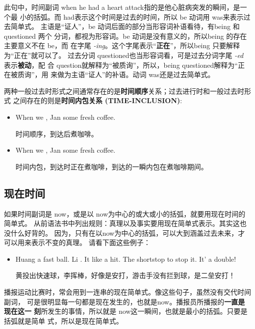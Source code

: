 此句中，时间副词 when he had a heart attack指的是他心脏病突发的瞬间，是一个最
小的括弧。而 had表示这个时间是过去的时间，所以 be 动词用 was来表示过去简单式。
主语是“证人”，be 动词后面的部分当形容词补语看待，有being 和 questioned 两个
分词，都视为形容词。be 动词是没有意义的，所以being 的存在主要意义不在 be，而
在字尾 \emph{-ing}。这个字尾表示“\textbf{正在}”，所以being 只要解释为“正在”就可以了。
过去分词 questioned也当形容词看，可是过去分词字尾 \emph{-ed} 表示\textbf{被动}，配
合 question就解释为“被质询”，所以，being questioned解释为“正在被质询”，用
来做为主语“证人”的补语。动词 was还是过去简单式。

两种一般过去时形式之间通常存在的是\textbf{时间顺序}关系；过去进行时和一般过去时形式
之间存在的则是\textbf{时间内包关系 (TIME-INCLUSION)}:
\begin{itemize}
\item When we , Jan  some fresh coffee.

  时间顺序，到达后煮咖啡。

\item When we , Jan some fresh coffee.

  时间内包，到达时正在煮咖啡，到达的一瞬内包在煮咖啡期间。
\end{itemize}

\subsection{现在时间}

如果时间副词是 now，或是以 now为中心的或大或小的括弧，就要用现在时间的简单式。
从前语法书中列出规则：真理以及事实要用现在简单式表示。其实这也没什么好背的。
因为，只有在以now为中心的括弧，可以大到涵盖过去未来，才可以用来表示不变的真理。
请看下面这些例子：

\begin{itemize}
\item Huang  a fast ball. Li . It  like a hit. The shortstop
   to stop it. It' a double!

  黄投出快速球，李挥棒，好像是安打，游击手没有拦到球，是二垒安打！
\end{itemize}

播报运动比赛时，常会用到一连串的现在简单式。像这些句子，虽然没有交代时间副词，
可是很明显每一句都是现在发生的，也就是now。播报员所播报的\textbf{一直是现在这一
  刻}所发生的事情，所以就是 now这一瞬间，也就是最小的括弧。只要是括弧就是简单
式，所以是现在简单式。

